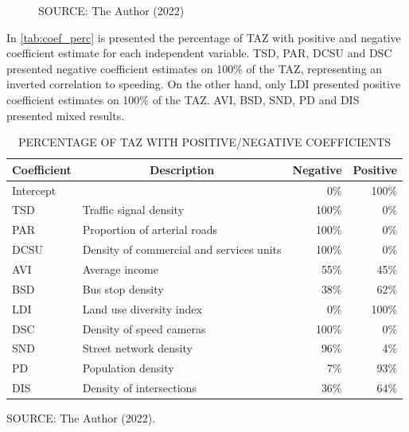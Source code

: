 \begin{figure}[!htbp]
\begin{subfigure}{0.5\textwidth}
    \end{subfigure}    
    \label{fig:gwr_par}
    \par SOURCE: The Author (2022)
\end{figure}

In \autoref{tab:coef_perc} is presented the percentage of TAZ with positive and negative coefficient estimate for each independent variable. TSD, PAR, DCSU and DSC presented negative coefficient estimates on 100\% of the TAZ, representing an inverted correlation to speeding. On the other hand, only LDI presented positive coefficient estimates on 100\% of the TAZ. AVI, BSD, SND, PD and DIS presented mixed results. 


\begin{table}[!htbp]
    \footnotesize
    \captionsetup{justification=raggedright,
        singlelinecheck=false,
        font=footnotesize}
    \caption{PERCENTAGE OF TAZ WITH POSITIVE/NEGATIVE COEFFICIENTS}
    \centering
    \begin{tabular}{llrr}
        \hline
        \multicolumn{1}{c}{\textbf{Coefficient}} & \multicolumn{1}{c}{\textbf{Description}} & \multicolumn{1}{c}{\textbf{Negative}} & \multicolumn{1}{c}{\textbf{Positive}} \\
        \hline
        \multicolumn{2}{l}{Intercept}                   &   0\% & 100\% \\
        TSD  & Traffic signal density                   & 100\% &   0\% \\
        PAR  & Proportion of arterial roads             & 100\% &   0\% \\
        DCSU & Density of commercial and services units & 100\% &   0\% \\
        AVI  & Average income                           &  55\% &  45\% \\
        BSD  & Bus stop density                         &  38\% &  62\% \\
        LDI  & Land use diversity index                 &   0\% & 100\% \\
        DSC  & Density of speed cameras                 & 100\% &   0\% \\
        SND  & Street network density                   &  96\% &   4\% \\
        PD   & Population density                       &   7\% &  93\% \\
        DIS  & Density of intersections                 &  36\% &  64\% \\
        \hline
    \end{tabular}
    \label{tab:coef_perc}
    \par \vspace{2mm} \footnotesize \raggedright
    SOURCE: The Author (2022).
\end{table}

